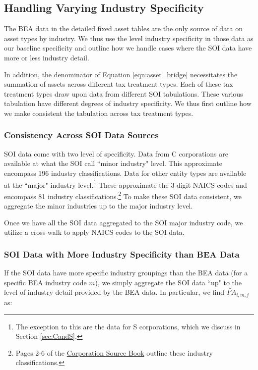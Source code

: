 \documentclass[article,11pt,letterpaper,fleqn]{article}
\theoremstyle{definition}
\numberwithin{equation}{section}
\begin{document}
\subsection{Handling Varying Industry Specificity}

The BEA data in the detailed fixed asset tables are the only source of data on asset types by industry.  We thus use the level industry specificity in those data as our baseline specificity and outline how we handle cases where the SOI data have more or less industry detail.  

In addition, the denominator of Equation \ref{eqn:asset_bridge} necessitates the summation of assets across different tax treatment types. Each of these tax treatment types draw upon data from different SOI tabulations.  These various tabulation have different degrees of industry specificity.  We thus first outline how we make consistent the tabulation across tax treatment types.

\subsubsection{Consistency Across SOI Data Sources}

SOI data come with two level of specificity.  Data from C corporations are available at what the SOI call ``minor industry" level.  This approximate encompass 196 industry classifications.  Data for other entity types are available at the ``major" industry level.\footnote{The exception to this are the data for S corporations, which we discuss in Section \ref{sec:CandS}.}  These approximate the 3-digit NAICS codes and encompass 81 industry classifications.\footnote{Pages 2-6 of the \href{https://www.irs.gov/pub/irs-soi/13cosbsec1.pdf}{Corporation Source Book} outline these industry classifications.}  To make these SOI data consistent, we aggregate the minor industries up to the major industry level.

Once we have all the SOI data aggregated to the SOI major industry code, we utilize a cross-walk to apply NAICS codes to the SOI data.

\subsubsection{SOI Data with More Industry Specificity than BEA Data}

If the SOI data have more specific industry groupings than the BEA data (for a specific BEA industry code $m$), we simply aggregate the SOI data ``up" to the level of industry detail provided by the BEA data.  In particular, we find $\widetilde{FA}_{i,m,j} $ as:
\end{document}
